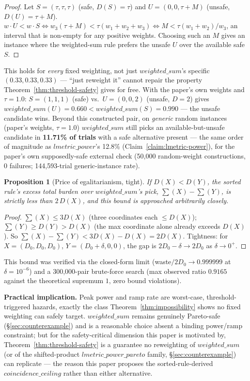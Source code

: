 \documentclass[sigconf,review,anonymous]{acmart}
\newtheorem{proposition}{Proposition}
\begin{document}
\begin{proof}
Let $S = (\tau, \tau, \tau)$ (safe, $D(S) = \tau$) and $U = (0, 0, \tau+M)$ (unsafe,
$D(U) = \tau + M$). $w \cdot U < w \cdot S \iff w_3(\tau+M) < \tau(w_1+w_2+w_3) \iff
M < \tau(w_1+w_2)/w_3$, an interval that is non-empty for any positive weights. Choosing such
an $M$ gives an instance where the weighted-sum rule prefers the unsafe $U$ over the available
safe $S$.
\end{proof}

This holds for \emph{every} fixed weighting, not just $\mathit{weighted\_sum}$'s specific
$(0.33, 0.33, 0.33)$ --- ``just reweight it'' cannot repair the property
Theorem~\ref{thm:threshold-safety} gives for free. With the paper's own weights and
$\tau = 1.0$: $S = (1,1,1)$ (safe) vs.\ $U = (0,0,2)$ (unsafe, $D{=}2$) gives
$\mathit{weighted\_sum}(U) = 0.660 < \mathit{weighted\_sum}(S) = 0.990$ --- the unsafe
candidate wins. Beyond this constructed pair, on \emph{generic} random instances (paper's
weights, $\tau{=}1.0$) $\mathit{weighted\_sum}$ still picks an available-but-unsafe candidate
in \textbf{11.71\% of trials} with a safe alternative present --- the same order of magnitude
as $\mathit{lmetric\_power}$'s 12.8\% (Claim~\ref{claim:lmetric-power}), for the paper's own
supposedly-safe external check (50{,}000 random-weight constructions, 0 failures;
144{,}593-trial generic-instance rate).

\begin{proposition}[Price of egalitarianism, tight]
\label{prop:price}
If $D(X) < D(Y)$, the sorted rule's excess total burden over $\mathit{weighted\_sum}$'s pick,
$\sum(X) - \sum(Y)$, is strictly less than $2\,D(X)$, and this bound is approached arbitrarily
closely.
\end{proposition}

\begin{proof}
$\sum(X) \le 3D(X)$ (three coordinates each $\le D(X)$); $\sum(Y) \ge D(Y) > D(X)$ (the max
coordinate alone already exceeds $D(X)$). So $\sum(X) - \sum(Y) < 3D(X) - D(X) = 2D(X)$.
Tightness: for $X = (D_0, D_0, D_0)$, $Y = (D_0+\delta, 0, 0)$, the gap is
$2D_0 - \delta \to 2D_0$ as $\delta \to 0^+$.
\end{proof}

This bound was verified via the closed-form limit (waste$/2D_0 \to 0.999999$ at
$\delta = 10^{-6}$) and a 300{,}000-pair brute-force search (max observed ratio $0.9165$
against the theoretical supremum $1$, zero bound violations).

\textbf{Practical implication.} Peak power and ramp rate are worst-case, threshold-triggered
hazards, exactly the class Theorem~\ref{thm:impossibility} shows no fixed weighting can
safely target. $\mathit{weighted\_sum}$ remains genuinely Pareto-safe
(\S\ref{sec:counterexample}) and is a reasonable choice absent a binding power/ramp
constraint; but for the safety-critical dimension this paper is motivated by,
Theorem~\ref{thm:threshold-safety} is a guarantee no reweighting of $\mathit{weighted\_sum}$
(or of the shifted-product $\mathit{lmetric\_power\_pareto}$ family,
\S\ref{sec:counterexample}) can replicate --- the reason this paper proposes the
sorted-rule-derived $\mathit{coincidence\_ceiling}$ rather than either alternative.
\end{document}
